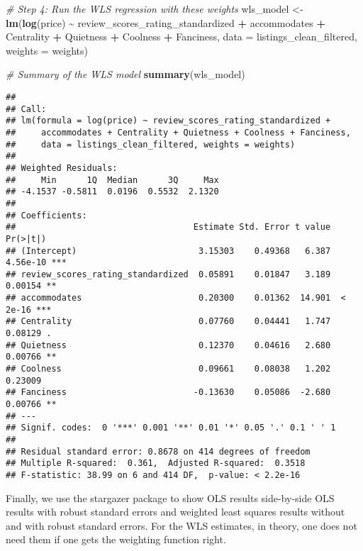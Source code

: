 \documentclass[
]{article}
\newenvironment{Shaded}{\begin{snugshade}}{\end{snugshade}}
\newcommand{\AttributeTok}[1]{\textcolor[rgb]{0.13,0.29,0.53}{#1}}
\newcommand{\CommentTok}[1]{\textcolor[rgb]{0.56,0.35,0.01}{\textit{#1}}}
\newcommand{\FunctionTok}[1]{\textcolor[rgb]{0.13,0.29,0.53}{\textbf{#1}}}
\newcommand{\NormalTok}[1]{#1}
\newcommand{\OtherTok}[1]{\textcolor[rgb]{0.56,0.35,0.01}{#1}}
\newcommand{\SpecialCharTok}[1]{\textcolor[rgb]{0.81,0.36,0.00}{\textbf{#1}}}
\begin{document}
\begin{Shaded}
\begin{Highlighting}[]
\CommentTok{\# Step 4: Run the WLS regression with these weights}
\NormalTok{wls\_model }\OtherTok{\textless{}{-}} \FunctionTok{lm}\NormalTok{(}\FunctionTok{log}\NormalTok{(price) }\SpecialCharTok{\textasciitilde{}}\NormalTok{ review\_scores\_rating\_standardized }\SpecialCharTok{+}\NormalTok{ accommodates }
                \SpecialCharTok{+}\NormalTok{ Centrality }\SpecialCharTok{+}\NormalTok{ Quietness }\SpecialCharTok{+}\NormalTok{ Coolness }\SpecialCharTok{+}\NormalTok{ Fanciness, }
                \AttributeTok{data =}\NormalTok{ listings\_clean\_filtered, }\AttributeTok{weights =}\NormalTok{ weights)}

\CommentTok{\# Summary of the WLS model}
\FunctionTok{summary}\NormalTok{(wls\_model)}
\end{Highlighting}
\end{Shaded}

\begin{verbatim}
## 
## Call:
## lm(formula = log(price) ~ review_scores_rating_standardized + 
##     accommodates + Centrality + Quietness + Coolness + Fanciness, 
##     data = listings_clean_filtered, weights = weights)
## 
## Weighted Residuals:
##     Min      1Q  Median      3Q     Max 
## -4.1537 -0.5811  0.0196  0.5532  2.1320 
## 
## Coefficients:
##                                   Estimate Std. Error t value Pr(>|t|)    
## (Intercept)                        3.15303    0.49368   6.387 4.56e-10 ***
## review_scores_rating_standardized  0.05891    0.01847   3.189  0.00154 ** 
## accommodates                       0.20300    0.01362  14.901  < 2e-16 ***
## Centrality                         0.07760    0.04441   1.747  0.08129 .  
## Quietness                          0.12370    0.04616   2.680  0.00766 ** 
## Coolness                           0.09661    0.08038   1.202  0.23009    
## Fanciness                         -0.13630    0.05086  -2.680  0.00766 ** 
## ---
## Signif. codes:  0 '***' 0.001 '**' 0.01 '*' 0.05 '.' 0.1 ' ' 1
## 
## Residual standard error: 0.8678 on 414 degrees of freedom
## Multiple R-squared:  0.361,  Adjusted R-squared:  0.3518 
## F-statistic: 38.99 on 6 and 414 DF,  p-value: < 2.2e-16
\end{verbatim}

Finally, we use the stargazer package to show OLS results side-by-side
OLS results with robust standard errors and weighted least squares
results without and with robust standard errors. For the WLS estimates,
in theory, one does not need them if one gets the weighting function
right.
\end{document}

